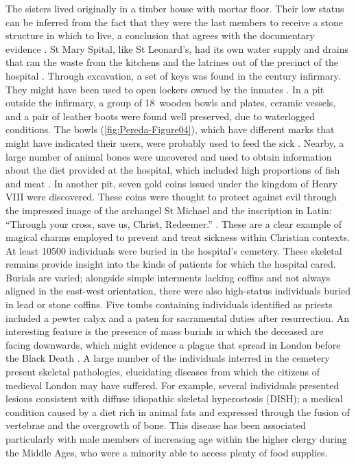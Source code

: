 \documentclass[%
	]{ijsra}
\begin{document}
The sisters lived originally in a timber house with mortar floor. Their low status can be inferred from the fact that they were the last members to receive a stone structure in which to live, a conclusion that agrees with the documentary evidence \parencites[36]{Phillpotts_1997}[51]{Rawcliffe_1999}[151]{Thomas_2002}.
St Mary Spital, like St Leonard’s, had its own water supply and drains that ran the waste from the kitchens and the latrines out of the precinct of the hospital \parencite[151]{Thomas_2002}. 
\IJSRAseparator
{}
Through excavation, a set of keys was found in the  century infirmary. They might have been used to open lockers owned by the inmates \parencite[99]{Thomas_2002}. In a pit outside the infirmary, a group of 18~wooden bowls and plates, ceramic vessels, and a pair of leather boots were found well preserved, due to waterlogged conditions. The bowls (\cref{fig:Pereda-Figure04}), %
which have different marks that might have indicated their users, were probably used to feed the sick \parencites[68]{Egan_2007}[99]{Thomas_2002}. 
Nearby, a large number of animal bones were uncovered and used to obtain information about the diet provided at the hospital, which included high proportions of fish and meat \parencite[59,113-114]{Phillpotts_1997}.
In another pit, seven gold coins issued under the kingdom of Henry\,VIII were discovered. These coins were thought to protect against evil through the impressed image of the archangel St Michael and the inscription in Latin: \enquote{Through your cross, save us, Christ, Redeemer.}  \parencite[70]{Egan_2007}. 
These are a clear example of magical charms employed to prevent and treat sickness within Christian contexts. 
At least \num{10500} individuals were buried in the hospital’s cemetery. These skeletal remains provide insight into the kinds of patients for which the hospital cared.  Burials are varied; alongside simple interments lacking coffins and not always aligned in the east-west orientation, there were also high-status individuals buried in lead or stone coffins. Five tombs containing individuals identified as priests included a pewter calyx and a paten for sacramental duties after resurrection. 
An interesting feature is the presence of mass burials in which the deceased are facing downwards, which might evidence a plague that spread in London before the Black Death \parencites[61]{Bowers_2007}[252]{Brodman2009}[73]{Egan_2007}[101]{Thomas 2002}[61]{White_2007}.
A large number of the individuals interred in the cemetery present skeletal pathologies, elucidating diseases from which the citizens of medieval London may have suffered. For example, several individuals presented lesions consistent with diffuse idiopathic skeletal hyperostosis (DISH); a medical condition caused by a diet rich in animal fats and expressed through the fusion of vertebrae and the overgrowth of bone. This disease has been associated particularly with male members of increasing age within the higher clergy during the Middle Ages, who were a minority able to access plenty of food supplies. 
\end{document}
